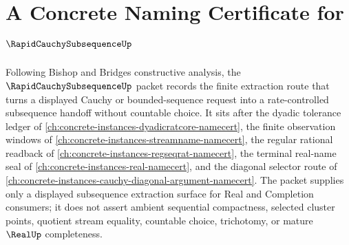 \chapter{A Concrete Naming Certificate for $\RapidCauchySubsequenceUp$}
\label{ch:concrete-instances-rapid-cauchy-subsequence-namecert}

Following Bishop and Bridges constructive analysis, the $\RapidCauchySubsequenceUp$ packet records the finite extraction route that turns a displayed Cauchy or bounded-sequence request into a rate-controlled subsequence handoff without countable choice. It sits after the dyadic tolerance ledger of \autoref{ch:concrete-instances-dyadicratcore-namecert}, the finite observation windows of \autoref{ch:concrete-instances-streamname-namecert}, the regular rational readback of \autoref{ch:concrete-instances-regseqrat-namecert}, the terminal real-name seal of \autoref{ch:concrete-instances-real-namecert}, and the diagonal selector route of \autoref{ch:concrete-instances-cauchy-diagonal-argument-namecert}. The packet supplies only a displayed subsequence extraction surface for Real and Completion consumers; it does not assert ambient sequential compactness, selected cluster points, quotient stream equality, countable choice, trichotomy, or mature $\RealUp$ completeness.

